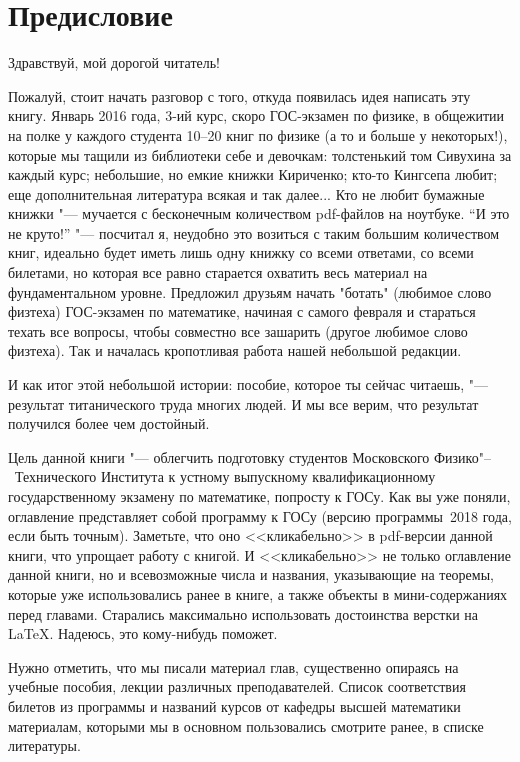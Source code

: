 \chapter*{Предисловие}

\begin{center} 
Здравствуй, мой дорогой читатель!
\end{center}

Пожалуй, стоит начать разговор с того, откуда появилась идея написать эту книгу. Январь 2016 года, 3-ий курс, скоро ГОС-экзамен по физике, в общежитии на полке у каждого студента 10--20 книг по физике (а то и больше у некоторых!), которые мы тащили из библиотеки себе и девочкам: толстенький том Сивухина за каждый курс; небольшие, но емкие книжки Кириченко; кто-то Кингсепа любит; еще дополнительная литература всякая и так далее... Кто не любит бумажные книжки "--- мучается с бесконечным количеством pdf-файлов на ноутбуке. ``И это не круто!'' "--- посчитал я, неудобно это возиться с таким большим количеством книг, идеально будет иметь лишь одну книжку со всеми ответами, со всеми билетами, но которая все равно старается охватить весь материал на фундаментальном уровне. Предложил друзьям начать "ботать" (любимое слово физтеха) ГОС-экзамен по математике, начиная с самого февраля и стараться техать все вопросы, чтобы совместно все зашарить (другое любимое слово физтеха). Так и началась кропотливая работа нашей небольшой редакции.


И как итог этой небольшой истории: пособие, которое ты сейчас читаешь, "--- результат титанического труда многих людей. И мы все верим, что результат получился более чем достойный. 

Цель данной книги "--- облегчить подготовку студентов Московского Физико"--~Технического Института к устному выпускному квалификационному государственному экзамену по математике, попросту к ГОСу. Как вы уже поняли, оглавление представляет собой программу к ГОСу (версию программы~2018 года, если быть точным). Заметьте, что оно <<кликабельно>> в pdf-версии данной книги, что упрощает работу с книгой. И <<кликабельно>> не только оглавление данной книги, но и всевозможные числа и названия, указывающие на теоремы, которые уже использовались ранее в книге, а также объекты в мини-содержаниях перед главами. Старались максимально использовать достоинства верстки на \LaTeX. Надеюсь, это кому-нибудь поможет. 

Нужно отметить, что мы писали материал глав, существенно опираясь на учебные пособия, лекции различных преподавателей. Список соответствия билетов из программы и названий курсов от кафедры высшей математики материалам, которыми мы в основном пользовались смотрите ранее, в списке литературы.

